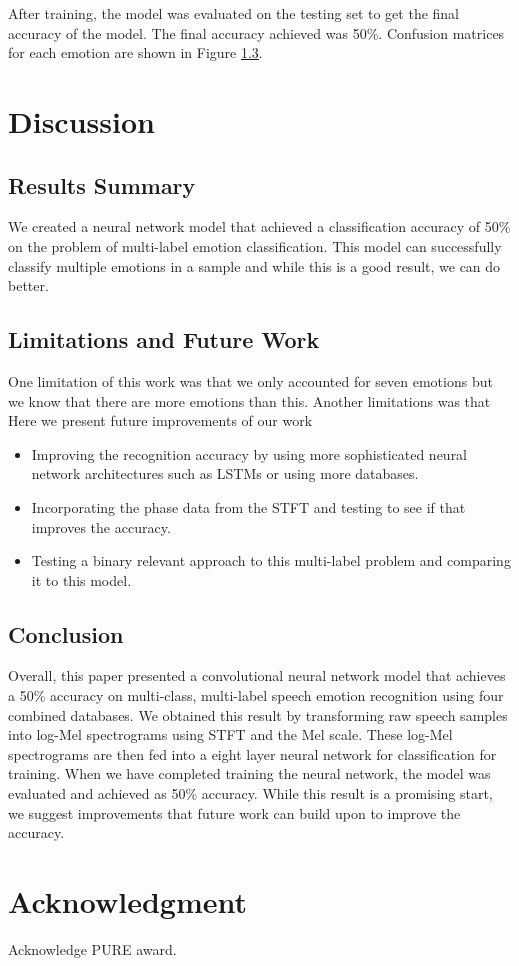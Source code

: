 \documentclass[conference]{IEEEtran}
\begin{document}
After training, the model was evaluated on the testing set to get the final accuracy of the model. The final accuracy achieved was 50\%. Confusion matrices for each emotion are shown in Figure \ref{}.

\section{Discussion}

\subsection{Results Summary}

We created a neural network model that achieved a classification accuracy of 50\% on the problem of multi-label emotion classification. This model can successfully classify multiple emotions in a sample and while this is a good result, we can do better.

\subsection{Limitations and Future Work}

One limitation of this work was that we only accounted for seven emotions but we know that there are more emotions than this. \cite{} Another limitations was that 
Here we present future improvements of our work 
\begin{itemize}
	\item Improving the recognition accuracy by using more sophisticated neural network architectures such as LSTMs or using more databases.
	\item Incorporating the phase data from the STFT and testing to see if that improves the accuracy.
	\item Testing a binary relevant approach to this multi-label problem and comparing it to this model.
\end{itemize}

\subsection{Conclusion}

Overall, this paper presented a convolutional neural network model that achieves a 50\% accuracy on multi-class, multi-label speech emotion recognition using four combined databases. We obtained this result by transforming raw speech samples into log-Mel spectrograms using STFT and the Mel scale. These log-Mel spectrograms are then fed into a eight layer neural network for classification for training. When we have completed training the neural network, the model was evaluated and achieved as 50\% accuracy. While this result is a promising start, we suggest improvements that future work can build upon to improve the accuracy.

\section*{Acknowledgment}
Acknowledge PURE award.




\end{document}
